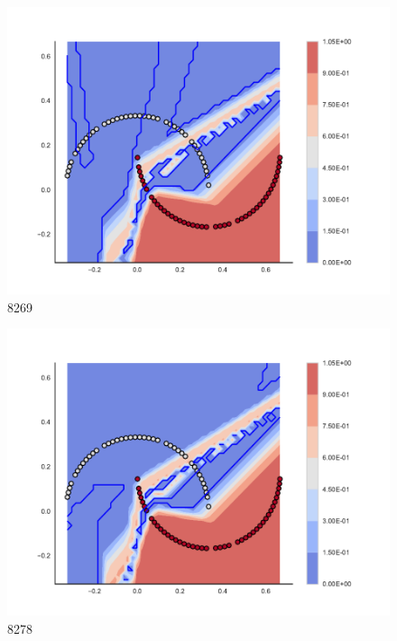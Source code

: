\begin{subfigure}[b]{0.09\textwidth}
    \includegraphics[clip, trim=2.35cm 1.75cm 4.5cm 0cm,width=\textwidth]{img/convergence/8269.pdf}
    \caption{8269}
    \label{fig:convergence_8269}
\end{subfigure}
%
\begin{subfigure}[b]{0.09\textwidth}
    \includegraphics[clip, trim=2.35cm 1.75cm 4.5cm 0cm,width=\textwidth]{img/convergence/8278.pdf}
    \caption{8278}
    \label{fig:convergence_8278}
\end{subfigure}
%
